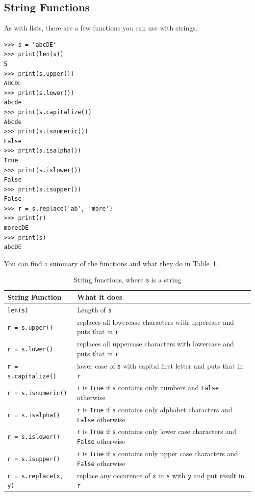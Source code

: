 \documentclass[11pt]{cselabheader}
\begin{document}
\subsection{String Functions}

As with lists, there are a few functions you can use with strings.

\begin{lstlisting}[style=ipython]
>>> s = 'abcDE'
>>> print(len(s))
5
>>> print(s.upper())
ABCDE
>>> print(s.lower())
abcde
>>> print(s.capitalize())
Abcde
>>> print(s.isnumeric())
False
>>> print(s.isalpha())
True
>>> print(s.islower())
False
>>> print(s.isupper())
False
>>> r = s.replace('ab', 'more')
>>> print(r)
morecDE
>>> print(s)
abcDE
\end{lstlisting}

You can find a summary of the functions and what they do in Table~\ref{tab:str}.

\begin{table}[!ht]
  \centering
  \begin{tabular}{ll}
    \toprule
    String Function & What it does \\
    \midrule
    \lstinline!len(s)! & Length of \lstinline!s! \\
    \lstinline!r = s.upper()! & replaces all lowercase characters with uppercase
    and puts that in \lstinline!r! \\
    \lstinline!r = s.lower()! & replaces all uppercase characters with lowercase
    and puts that in \lstinline!r! \\
    \lstinline!r = s.capitalize()! & lower case of \lstinline!s! with capital
    first letter and puts that in \lstinline!r! \\
    \lstinline!r = s.isnumeric()! & \lstinline!r! is \lstinline!True! if
    \lstinline!s! contains only numbers and \lstinline!False! otherwise\\
    \lstinline!r = s.isalpha()! & \lstinline!r! is \lstinline!True! if
    \lstinline!s! contains only alphabet characters and \lstinline!False!
    otherwise\\
    \lstinline!r = s.islower()! & \lstinline!r! is \lstinline!True! if
    \lstinline!s! contains only lower case characters and \lstinline!False!
    otherwise\\
    \lstinline!r = s.isupper()! & \lstinline!r! is \lstinline!True! if
    \lstinline!s! contains only upper case characters and \lstinline!False!
    otherwise\\
    \lstinline!r = s.replace(x, y)! & replace any occurence of \lstinline!x! in
    \lstinline!s! with \lstinline!y! and put result in \lstinline!r! \\
    \bottomrule 
  \end{tabular}
  \caption{String functions, where \lstinline!s! is a string}
  \label{tab:str}
\end{table}
\end{document}
